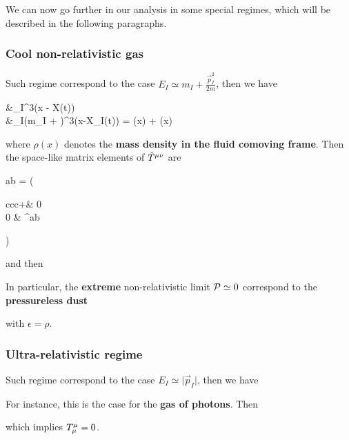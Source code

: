 \documentclass[../main/main.tex]{subfiles}
\begin{document}
We can now go further in our analysis in some special regimes, which will be described in the following paragraphs.

\subsubsection{Cool non-relativistic gas}

\newcommand{\nRel}{\text{\tiny non-rel}}
\newcommand{\Dust}{\text{\tiny dust}}

Such regime correspond to the case $E_I \simeq m_I+\frac{\vec p_I^2}{2m}$, then we have
\begin{eqalign}
	\press &\simeq {}\sum_I\delta^3(\hat x - \hat X(t))\\
	\epsilon &\simeq \sum_I(m_I + )\delta^3(x-\hat X_I(t)) = \rho(x) + \press(x)
\end{eqalign}
where $\rho(x)$ denotes the \textbf{mass density in the fluid comoving frame}. Then the space-like matrix elements of $\hat T^{\mu \nu}$ are
\begin{eqalign}
	\hiemt ab = \left(\begin{array}{ccc}\rho+\press & 0 \\0 & \press\delta^{ab} \end{array}\right)
\end{eqalign}
and then
\begin{eqalign}\boxed{
	\iemt\mu\nu_{\nRel} \simeq(\rho+\frac52\press)u^\mu u^\nu+\press\imet\mu\nu
}\end{eqalign}

In particular, the \textbf{extreme} non-relativistic limit $\mathcal P\simeq0$ correspond to the \textbf{pressureless dust}
\begin{eqalign}\boxed{
	\imet\mu\nu_\Dust = \epsilon u^\mu u^\nu
}\end{eqalign}
with $\epsilon=\rho$.

\subsubsection{Ultra-relativistic regime}

Such regime correspond to the case $E_I \simeq \vert\vec p_I\vert$, then we have
\begin{eqalign}\end{eqalign}
For instance, this is the case for the \textbf{gas of photons}. Then
\begin{eqalign}\end{eqalign}
which implies ${T}^{\mu}_{\mu}=0$. 
\end{document}
